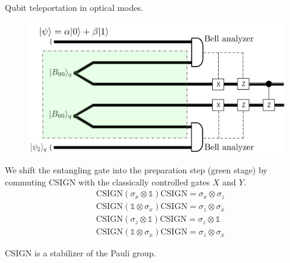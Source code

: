 \documentclass{beamer}
\begin{document}
\begin{frame}
\begin{center}

Qubit teleportation in optical modes.

\begin{figure}[!htb]
\centering
\includegraphics[scale=.20]{immagini/tele.png}
\end{figure}

\end{center}
\end{frame}

\begin{frame}
\begin{center}

We shift the entangling gate into the preparation step (green stage) by commuting CSIGN with the classically controlled gates $X$ and $Y$.\\

\begin{align*}
& \text{CSIGN} \left( \sigma_x \otimes \mathds{1} \right) \text{CSIGN} =\sigma_x \otimes \sigma_z \\
& \text{CSIGN} \left( \mathds{1} \otimes \sigma_x \right) \text{CSIGN} = \sigma_z \otimes \sigma_x \\
& \text{CSIGN} \left( \sigma_z \otimes \mathds{1} \right) \text{CSIGN} = \sigma_z \otimes \mathds{1} \\
& \text{CSIGN} \left( \mathds{1} \otimes \sigma_x \right) \text{CSIGN} = \sigma_z \otimes \sigma_x
\end{align*}

CSIGN is a stabilizer of the Pauli group.

\end{center}
\end{frame}
\end{document}
